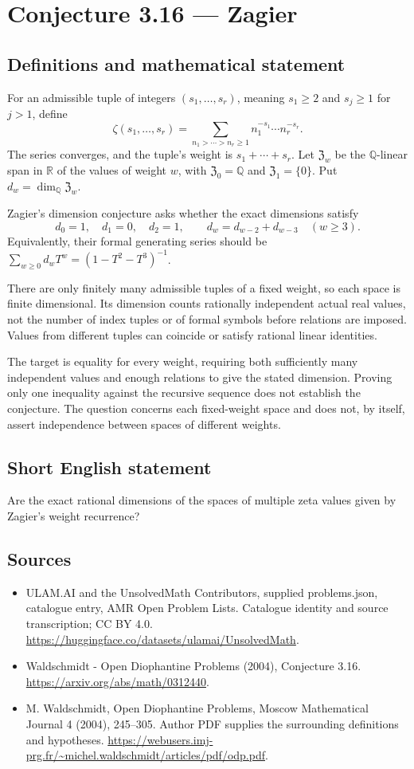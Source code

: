 \documentclass[11pt,a4paper]{article}
\begin{document}
\section*{Conjecture 3.16 — Zagier}\label{statement}

\subsection{Definitions and mathematical statement}
For an admissible tuple of integers $(s_1,\ldots,s_r)$, meaning $s_1\ge2$ and $s_j\ge1$ for $j>1$, define
\[
\zeta(s_1,\ldots,s_r)=\sum_{n_1>\cdots>n_r\ge1}
 n_1^{-s_1}\cdots n_r^{-s_r}.
\]
The series converges, and the tuple's weight is $s_1+\cdots+s_r$. Let $\mathfrak Z_w$ be the $\mathbb Q$-linear span in $\mathbb R$ of the values of weight $w$, with $\mathfrak Z_0=\mathbb Q$ and $\mathfrak Z_1=\{0\}$. Put $d_w=\dim_{\mathbb Q}\mathfrak Z_w$.

Zagier's dimension conjecture asks whether the exact dimensions satisfy
\[
d_0=1,\quad d_1=0,\quad d_2=1,\qquad
 d_w=d_{w-2}+d_{w-3}\quad(w\ge3).
\]
Equivalently, their formal generating series should be $\sum_{w\ge0}d_w T^w=(1-T^2-T^3)^{-1}$.

There are only finitely many admissible tuples of a fixed weight, so each space is finite dimensional. Its dimension counts rationally independent actual real values, not the number of index tuples or of formal symbols before relations are imposed. Values from different tuples can coincide or satisfy rational linear identities.

The target is equality for every weight, requiring both sufficiently many independent values and enough relations to give the stated dimension. Proving only one inequality against the recursive sequence does not establish the conjecture. The question concerns each fixed-weight space and does not, by itself, assert independence between spaces of different weights.
\subsection{Short English statement}
Are the exact rational dimensions of the spaces of multiple zeta values given by Zagier’s weight recurrence?
\subsection{Sources}
\begin{itemize}
\item[S1] ULAM.AI and the UnsolvedMath Contributors, supplied problems.json, catalogue entry, AMR Open Problem Lists. Catalogue identity and source transcription; CC BY 4.0.
\url{https://huggingface.co/datasets/ulamai/UnsolvedMath}.
\item[S2] Waldschmidt - Open Diophantine Problems (2004), Conjecture 3.16. 
\url{https://arxiv.org/abs/math/0312440}.
\item[S3] M. Waldschmidt, Open Diophantine Problems, Moscow Mathematical Journal 4 (2004), 245–305. Author PDF supplies the surrounding definitions and hypotheses.
\url{https://webusers.imj-prg.fr/~michel.waldschmidt/articles/pdf/odp.pdf}.
\end{itemize}
\end{document}
